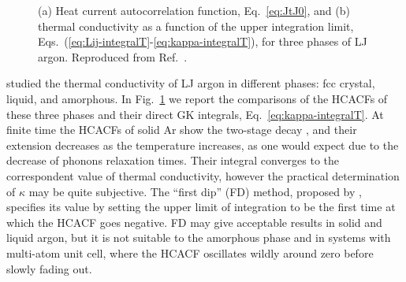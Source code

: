 \begin{LEtext}
\begin{figure}[!tb]
    \begin{center}
        \hfill
    \end{center}
	\caption{(a) Heat current autocorrelation function, Eq.~\eqref{eq:JtJ0}, and
    (b) thermal conductivity as a function of the upper integration limit, Eqs.~(\ref{eq:Lij-integralT}-\ref{eq:kappa-integralT}), for three phases of LJ argon. Reproduced from Ref.~\cite{McGaughey2004a}.} \label{fig:argon-gk-phases-examples}
\end{figure}
\citet{McGaughey2006,McGaughey2004a} studied the thermal conductivity of LJ argon in different phases: fcc crystal, liquid, and amorphous. In Fig.~\ref{fig:argon-gk-phases-examples} we report the comparisons of the HCACFs of these three phases and their direct GK integrals, Eq.~\eqref{eq:kappa-integralT}. At finite time the HCACFs of solid Ar show the two-stage decay \cite{Ladd1986}, and their extension decreases as the temperature increases, as one would expect due to the decrease of phonons relaxation times. Their integral converges to the correspondent value of thermal conductivity, however the practical determination of $\kappa$ may be quite subjective. The ``first dip'' (FD) method, proposed by \citet{Li1998}, specifies its value by setting the upper limit of integration to be the first time at which the HCACF goes negative. FD may give acceptable results in solid and liquid argon, but it is not suitable to the amorphous phase and in systems with multi-atom unit cell, where the HCACF oscillates wildly around zero before slowly fading out. 


\end{LEtext}
